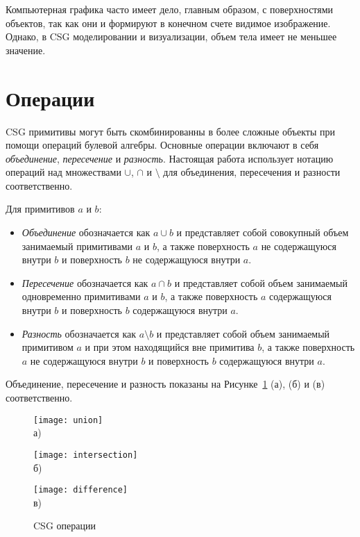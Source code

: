 Компьютерная графика часто имеет дело, главным образом, с поверхностями объектов, так как они и формируют в конечном счете видимое изображение. Однако, в CSG моделировании и визуализации, объем тела имеет не меньшее значение.

\section{Операции} \label{sect_operations}

CSG примитивы могут быть скомбинированны в более сложные объекты при помощи операций булевой алгебры. Основные операции включают в себя \textit{объединение}, \textit{пересечение} и \textit{разность}. Настоящая работа использует нотацию операций над множествами $\cup$, $\cap$ и $\setminus$ для объединения, пересечения и разности соответственно.

\noindent Для примитивов $a$ и $b$:
\begin{itemize}
  \item \textit{Объединение} обозначается как $a \cup b$ и представляет собой совокупный объем занимаемый примитивами $a$ и $b$, а также поверхность $a$ не содержащуюся внутри $b$ и поверхность $b$ не содержащуюся внутри $a$.

  \item \textit{Пересечение} обозначается как $a \cap b$ и представляет собой объем занимаемый одновременно примитивами $a$ и $b$, а также поверхность $a$ содержащуюся внутри $b$ и поверхность $b$ содержащуюся внутри $a$.

  \item \textit{Разность} обозначается как $a \setminus b$ и представляет собой объем занимаемый примитивом $a$ и при этом находящийся вне примитива $b$, а также поверхность $a$ не содержащуюся внутри $b$ и поверхность $b$ содержащуюся внутри $a$.
\end{itemize}

Объединение, пересечение и разность показаны на Рисунке~\ref{fig:operations} (а), (б) и (в) соответственно.

\begin{figure}[ht]
  \begin{minipage}[ht]{0.3\linewidth}\centering
    \texttt{[image: union]} \\ а)
  \end{minipage}
  \hfill
  \begin{minipage}[ht]{0.3\linewidth}\centering
    \texttt{[image: intersection]} \\ б)
  \end{minipage}
  \hfill
  \begin{minipage}[ht]{0.3\linewidth}\centering
    \texttt{[image: difference]} \\ в)
  \end{minipage}
  \caption{CSG операции}
  \label{fig:operations}  
\end{figure}

